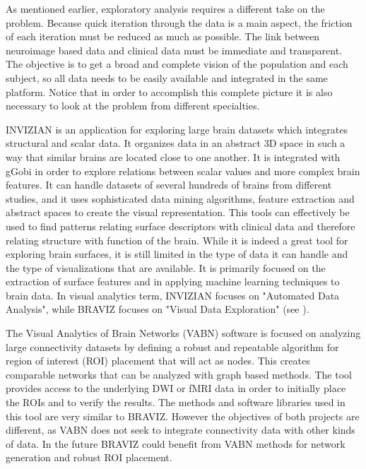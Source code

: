 \documentclass[utf8,paper]{frontiersSCNS} %
\begin{document}
As mentioned earlier, exploratory analysis requires a different take on the problem. Because quick iteration through the data is a main aspect, the friction of each iteration must be reduced as much as possible. The link between neuroimage based data and clinical data must be immediate and transparent. The objective is to get a broad and complete vision of the population and each subject, so all data needs to be easily available and integrated in the same platform. Notice that in order to accomplish this complete picture it is also necessary to look at the problem from different specialties.

INVIZIAN\citep{bowman_query-based_2011,bowman_feature-similarity_2012,bowman_visual_2012} is an application for exploring large brain datasets which integrates structural and scalar data. It organizes data in an abstract 3D space in such a way that similar brains are located close to one another. It is integrated with gGobi\citep{cook_interactive_2007} in order to explore relations between scalar values and more complex brain features. It can handle datasets of several hundreds of brains from different studies, and it uses sophisticated data mining algorithms, feature extraction and abstract spaces to create the visual representation. This tools can effectively be used to find patterns relating surface descriptors with clinical data and therefore relating structure with function of the brain. While it is indeed a great tool for exploring brain surfaces, it is still limited in the type of data it can handle and the type of visualizations that are available. It is primarily focused on the extraction of surface features and in applying machine learning techniques to brain data. In visual analytics term, INVIZIAN focuses on "Automated Data Analysis", while BRAVIZ focuses on "Visual Data Exploration" (see \citep{keim_mastering_????}).

The Visual Analytics of Brain Networks\citep{li_visual_2012} (VABN) software is focused on analyzing large connectivity datasets by defining a robust and repeatable algorithm for region of interest (ROI) placement that will act as nodes. This creates comparable networks that can be analyzed with graph based methods. The tool provides access to the underlying DWI or fMRI data in order to initially place the ROIs and to verify the results. The methods and software libraries used in this tool are very similar to BRAVIZ. However the objectives of both projects are different, as VABN does not seek to integrate connectivity data with other kinds of data. In the future BRAVIZ could benefit from VABN methods for network generation and robust ROI placement. 
\end{document}
